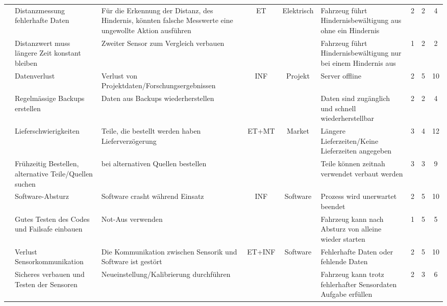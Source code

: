 \documentclass[../main.tex]{subfiles}
\begin{document}
\begin{landscape}
\begin{longtable}{|c|p{4.5cm}|p{5cm}|c|c|p{4.5cm}|c|c|c|}
\rowcolor{white} & Distanzmessung fehlerhafte Daten & Für die Erkennung der Distanz, des Hindernis, könnten falsche Messwerte eine ungewollte Aktion ausführen & ET & Elektrisch & Fahrzeug führt Hindernisbewältigung aus ohne ein Hindernis & 2 & 2 & 4 \\* \cline{2-3} \cline{6-9}
\rowcolor{white} \multirow{-2}{*}{R4} & Distanzwert muss längere Zeit konstant bleiben & Zweiter Sensor zum Vergleich verbauen & & & Fahrzeug führt Hindernisbewältigung nur bei einem Hindernis aus & 1 & 2 & 2 \\ \hline

\rowcolor[HTML]{F5F5F5} & Datenverlust & Verlust von Projektdaten/Forschungsergebnissen & INF & Projekt & Server offline & 2 & 5 & 10 \\* \cline{2-3} \cline{6-9}
\rowcolor[HTML]{F5F5F5} \multirow{-2}{*}{R5} & Regelmässige Backups erstellen & Daten aus Backups wiederherstellen & & & Daten sind zugänglich und schnell wiederherstellbar & 2 & 2 & 4 \\ \hline

\rowcolor{white} & Lieferschwierigkeiten & Teile, die bestellt werden haben Lieferverzögerung & ET+MT &  Market & Längere Lieferzeiten/Keine Lieferzeiten angegeben & 3 & 4 & 12 \\* \cline{2-3} \cline{6-9}
\rowcolor{white} \multirow{-2}{*}{R6} & Frühzeitig Bestellen, alternative Teile/Quellen suchen & bei alternativen Quellen bestellen & & & Teile können zeitnah verwendet verbaut werden & 3 & 3 & 9 \\ \hline

\rowcolor[HTML]{F5F5F5} & Software-Absturz & Software crasht während Einsatz & INF & Software & Prozess wird unerwartet beendet & 2 & 5 & 10 \\* \cline{2-3} \cline{6-9}
\rowcolor[HTML]{F5F5F5} \multirow{-2}{*}{R7} & Gutes Testen des Codes und Failsafe einbauen & Not-Aus verwenden & & & Fahrzeug kann nach Absturz von alleine wieder starten & 1 & 5 & 5 \\
\hline
\rowcolor{white} & Verlust Sensorkommunikation & Die Kommunikation zwischen Sensorik und Software ist gestört & ET+INF & Software & Fehlerhafte Daten oder fehlende Daten & 2 & 5 & 10 \\* \cline{2-3} \cline{6-9}
\rowcolor{white} \multirow{-2}{*}{R8} & Sicheres verbauen und Testen der Sensoren & Neueinstellung/Kalibrierung durchführen & & & Fahrzeug kann trotz fehlerhafter Sensordaten Aufgabe erfüllen & 2 & 3 & 6 \\ \hline


\end{longtable}
\end{landscape}
\end{document}
